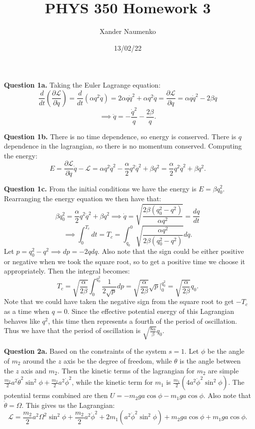 \documentclass[letterpaper, reqno,11pt]{article}
\begin{document}
\title{PHYS 350 Homework 3}
\date{13/02/22}
\author{Xander Naumenko}
\maketitle

{\noindent\bf Question 1a.} Taking the Euler Lagrange equation: 
\[
\frac{d}{dt}\left( \frac{\partial\mathcal L}{\partial \dot q} \right)=\frac{d}{dt}\left( \alpha q^2\dot q\right)=2\alpha q\dot q^2+\alpha q^2\ddot q=\frac{\partial\mathcal L}{\partial q}=\alpha q\dot q^2-2\beta q
\]
\[
\implies\ddot q=-\frac{\dot q^2}{q}-\frac{2\beta}{q}
.\]

{\noindent\bf Question 1b.} There is no time dependence, so energy is conserved. There is $q$ dependence in the lagrangian, so there is no momentum conserved. Computing the energy: 
\[
E=\frac{\partial\mathcal L}{\partial \dot q}\dot q-\mathcal L=\alpha q^2\dot q^2-\frac{\alpha}{2}q^2\dot q^2+\beta q^2=\frac{\alpha}{2} q^2\dot q^2+\beta q^2
.\]

{\noindent\bf Question 1c.} From the initial conditions we have the energy is $E=\beta q_0^2$. Rearranging the energy equation we then have that: 
\[
\beta q_0^2=\frac{\alpha}{2} q^2\dot q^2+\beta q^2\implies \dot q=\sqrt{\frac{2\beta\left( q_0^2-q^2 \right) }{\alpha q^2}}=\frac{dq}{dt}
\]
\[
\implies \int_0^{T_c} dt=T_c=\int_{q_0}^0 \sqrt{\frac{\alpha q^2}{2\beta\left( q_0^2-q^2 \right) }} dq
.\]
Let $p=q_0^2-q^2\implies dp=-2qdq$. Also note that the sign could be either positive or negative when we took the square root, so to get a positive time we choose it appropriately. Then the integral becomes: 
\[
T_c=\sqrt{\frac{\alpha}{2\beta}} \int_{0}^{q_0^2} \frac{1}{2\sqrt{p} }dp=\sqrt{\frac{\alpha}{2\beta}}\sqrt{p} \bigg|_0^{q_0^2}=\sqrt{\frac{\alpha}{2\beta}} q_0
.\]
Note that we could have taken the negative sign from the square root to get $-T_c$ as a time when $q=0$. Since the effective potential energy of this Lagrangian behaves like $q^2$, this time then represents a fourth of the period of oscillation. Thus we have that the period of oscillation is $ \sqrt{\frac{8\alpha}{\beta}} q_0$. 

{\noindent\bf Question 2a.} Based on the constraints of the system $s=1$. Let $\phi$ be the angle of $ m_2$ around the $z$ axis be the degree of freedom, while $\theta$ is the angle between the $z$ axis and $m_2$. Then the kinetic terms of the lagrangian for $m_2$ are simple $ \frac{m_2}{2}a^2\dot\theta ^2\sin^2\phi+\frac{m_2}{2}a^2\dot\phi^2 $, while the kinetic term for $m_1$ is $\frac{m_1}{2}\left( 4a^2\dot\phi^2\sin^2\phi \right) $. The potential terms combined are then $U=-m_2ga\cos\phi-m_1ga\cos\phi$. Also note that $\dot\theta=\Omega$. This gives us the Lagrangian: 
\[
\mathcal L=\frac{m_2}{2}a^2\Omega^2\sin^2\phi+\frac{m_2}{2}a^2\dot\phi^2+2m_1\left( a^2\dot\phi^2\sin^2\phi \right)+m_2ga\cos\phi+m_1ga\cos\phi
.\]
\end{document}
